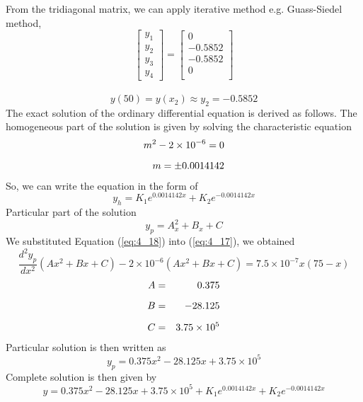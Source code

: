 \documentclass[12pt]{report}
\newcommand{\sps}{\\[0.2cm]}
\newcommand{\refn}[1]{(\ref{#1})}
\newcommand{\refx}[1]{\refn{eq:#1}}
\begin{document}
	From the tridiagonal matrix, we can apply iterative method e.g. Guass-Siedel method,
	\begin{equation*}
		\begin{bmatrix}
			y_1\\
			y_2\\
			y_3\\
			y_4
		\end{bmatrix}
		=
		\begin{bmatrix}
			0\\
			-0.5852\\
			-0.5852\\
			0\\
		\end{bmatrix}
	\end{equation*}
	~\\
	\begin{equation*}
		y(50) = y(x_2) \approx y_2 = -0.5852
	\end{equation*}
	The exact solution of the ordinary differential equation is derived as follows. The homogeneous part of the solution is given by solving the characteristic equation
	\begin{eqnarray}
		m^2 - 2 \times 10^{-6} = 0\notag\sps
		m = \pm 0.0014142\notag
	\end{eqnarray}
	So, we can write the equation in the form of
	\begin{equation*}
		y_h = K_1 e^{0.0014142x} + K_2e^{-0.0014142x}
	\end{equation*}
	Particular part of the solution
	\begin{equation}
		y_p = A_x^2 + B_x + C \label{eq:4_18}
	\end{equation}
	We substituted Equation \refx{4_18} into \refx{4_17}, we obtained
	\begin{equation*}
		\frac{d^2y_p}{dx^2}(Ax^2 + Bx + C)- 2\times 10^{-6}(Ax^2 + Bx + C) = 7.5 \times 10^{-7}x(75-x)
	\end{equation*}
	\begin{eqnarray}
		A &=& 0.375\notag\sps
		B &=& -28.125\notag\sps
		C &=& 3.75 \times 10^5\notag
	\end{eqnarray}
	Particular solution is then written as
	\begin{equation}
		y_p = 0.375x^2 - 28.125x + 3.75 \times 10^5 \label{eq:4_19}
	\end{equation}
	Complete solution is then given by
	\begin{equation}
		y = 0.375x^2 - 28.125x + 3.75 \times 10^5 + K_1 e^{0.0014142x} + K_2 e^{-0.0014142x} \label{eq:4_20}
	\end{equation}
\end{document}
